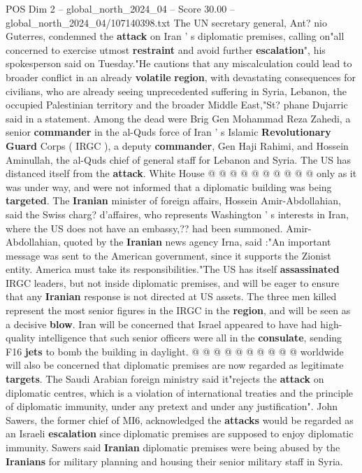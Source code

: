 \begin{textsample}{POS Dim 2 – global\_north\_2024\_04 – Score 30.00 – global\_north\_2024\_04/107140398.txt}
The UN secretary general, Ant? nio Guterres, condemned the \textbf{attack} on Iran ' s diplomatic premises, calling on"all concerned to exercise utmost \textbf{restraint} and avoid further \textbf{escalation}", his spokesperson said on Tuesday."He cautions that any miscalculation could lead to broader conflict in an already \textbf{volatile} \textbf{region}, with devastating consequences for civilians, who are already seeing unprecedented suffering in Syria, Lebanon, the occupied Palestinian territory and the broader Middle East,"St? phane Dujarric said in a statement.
Among the dead were Brig Gen Mohammad Reza Zahedi, a senior \textbf{commander} in the al-Quds force of Iran ' s Islamic \textbf{Revolutionary} \textbf{Guard} Corps ( IRGC ), a deputy \textbf{commander}, Gen Haji Rahimi, and Hossein Aminullah, the al-Quds chief of general staff for Lebanon and Syria.
The US has distanced itself from the \textbf{attack}.
White House @ @ @ @ @ @ @ @ @ @ only as it was under way, and were not informed that a diplomatic building was being \textbf{targeted}.
The \textbf{Iranian} minister of foreign affairs, Hossein Amir-Abdollahian, said the Swiss charg? d'affaires, who represents Washington ' s interests in Iran, where the US does not have an embassy,?? had been summoned.
Amir-Abdollahian, quoted by the \textbf{Iranian} news agency Irna, said :"An important message was sent to the American government, since it supports the Zionist entity.
America must take its responsibilities."The US has itself \textbf{assassinated} IRGC leaders, but not inside diplomatic premises, and will be eager to ensure that any \textbf{Iranian} response is not directed at US assets.
The three men killed represent the most senior figures in the IRGC in the \textbf{region}, and will be seen as a decisive \textbf{blow}.
Iran will be concerned that Israel appeared to have had high-quality intelligence that such senior officers were all in the \textbf{consulate}, sending F16 \textbf{jets} to bomb the building in daylight. @ @ @ @ @ @ @ @ @ @ worldwide will also be concerned that diplomatic premises are now regarded as legitimate \textbf{targets}.
The Saudi Arabian foreign ministry said it"rejects the \textbf{attack} on diplomatic centres, which is a violation of international treaties and the principle of diplomatic immunity, under any pretext and under any justification".
John Sawers, the former chief of MI6, acknowledged the \textbf{attacks} would be regarded as an Israeli \textbf{escalation} since diplomatic premises are supposed to enjoy diplomatic immunity.
Sawers said \textbf{Iranian} diplomatic premises were being abused by the \textbf{Iranians} for military planning and housing their senior military staff in Syria.

\end{textsample}

